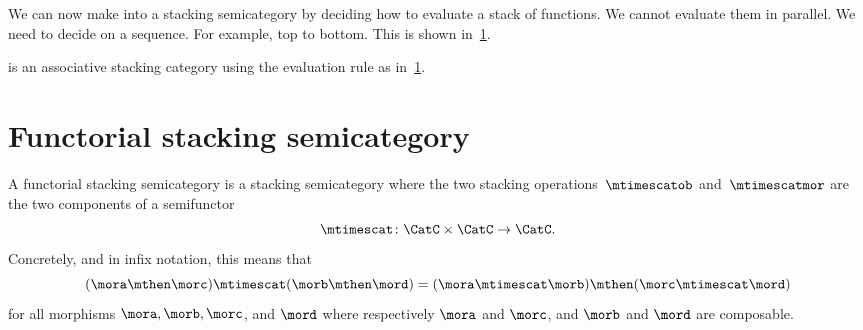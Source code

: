 We can now make \Effects into a stacking semicategory by deciding how to evaluate a stack of functions.
We cannot evaluate them in parallel.
We need to decide on a sequence.
For example, top to bottom.
This is shown in~\cref{fig:effect-stacking}.

\begin{lemma}
    \label{lem:effects-is-stacking}
    \Effects is an associative stacking category using the evaluation rule as in~\cref{fig:effect-stacking}.
\end{lemma}

\begin{figure}[h!]
    \centering
    \caption{}
    \label{fig:effect-stacking}
\end{figure}



\section{Functorial stacking semicategory}

\begin{ctdefinition}
    \label{def:functorial-stacking-semi-cat}
    A functorial stacking semicategory is a stacking semicategory where the two stacking operations~$\mtimescatob$ and~$\mtimescatmor$ are the two components of a semifunctor
    \begin{equation}
        \mtimescat\colon \CatC \times \CatC \to \CatC.
    \end{equation}
Concretely, and in infix notation, this means that
\begin{equation}
(\mora \mthen \morc ) \mtimescat (\morb \mthen \mord )
    =
    (\mora \mtimescat \morb )
    \mthen (\morc \mtimescat \mord )
\end{equation}
for all morphisms $\mora, \morb, \morc$, and $\mord$ where respectively $\mora$ and $\morc$, and $\morb$ and $\mord$ are composable.
\end{ctdefinition}

